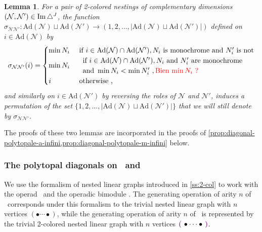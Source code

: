 \documentclass[twoside, 12pt]{amsart}
\newtheorem{lemma}[definition]{Lemma}
\theoremstyle{remark}
\begin{document}
\begin{lemma} 
\label{prop:signs-mul}
For a pair of 2-colored nestings of complementary dimensions $(\mathcal{N},\mathcal{N}')\in \operatorname{Im}\triangle^J$, the function $\sigma_{\mathcal{N}\mathcal{N}'}: \mathrm{Ad}(\mathcal{N})\sqcup \mathrm{Ad}(\mathcal{N}') \to (1,2,\ldots,|\mathrm{Ad}(\mathcal{N})\sqcup \mathrm{Ad}(\mathcal{N}')|)$ defined on $i \in \mathrm{Ad}(\mathcal{N})$ by
\begin{equation*}
  \sigma_{\mathcal{N}\mathcal{N}'}(i)= 
  \begin{cases}
    \min N_i & \text{ if } i \in \mathrm{Ad}(\mathcal{N})\cap \mathrm{Ad}(\mathcal{N}') , N_i \text{ is monochrome and } N_i' \text{ is not} \\
    \min N_i & \begin{array}{l}
         \text{ if } i \in \mathrm{Ad}(\mathcal{N})\cap \mathrm{Ad}(\mathcal{N}'), N_i \text{ and } N_i' \text{ are monochrome} \\
         \text{ and } \min N_i < \min N_i' \ , \text{\textcolor{red}{Bien $\min N_i$ ?}}
    \end{array}   \\ 
    i & \text{ otherwise ,} 
  \end{cases}
\end{equation*}
and similarly on $i \in \mathrm{Ad}(\mathcal{N}')$ by reversing the roles of $\mathcal{N}$ and $\mathcal{N}'$, induces a permutation of the set $\{1,2,\ldots,|\mathrm{Ad}(\mathcal{N})\sqcup \mathrm{Ad}(\mathcal{N}')|\}$ that we will still denote by $\sigma_{\mathcal{N}\mathcal{N}'}$.
\end{lemma}

\noindent The proofs of these two lemmas are incorporated in the proofs of \cref{prop:diagonal-polytopale-a-infini,prop:diagonal-polytopale-m-infini} below. 

\subsubsection{The polytopal diagonals on \Ainf\ and \Minf}

We use the formalism of nested linear graphs introduced in \cref{ss:2-col} to work with the operad \Ainf\ and the operadic bimodule \Minf . The generating operation of arity $n$ of \Ainf\ corresponds under this formalism to the trivial nested linear graph with $n$ vertices $(\bullet \cdots \bullet )$, while the generating operation of arity $n$ of \Minf\ is represented by the trivial 2-colored nested linear graph with $n$ vertices $\purple{\bullet \cdots \bullet}$.
\end{document}

